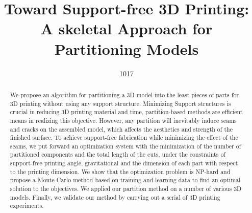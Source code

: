 \documentclass{egpubl}
\title[Toward Support-free 3D Printing:]%
      {Toward Support-free 3D Printing: A skeletal Approach for Partitioning Models}
\author[1017]{1017}
\begin{document}

\maketitle

\begin{abstract}
   We propose an algorithm for partitioning a 3D model into the least pieces of parts for 3D printing without using any support structure. Minimizing Support structures is crucial in reducing 3D printing material and time, partition-based methods are efficient means in realizing this objective. However, any partition will inevitably induce seams and cracks on the assembled model, which affects the aesthetics and strength of the finished surface. To achieve support-free fabrication while minimizing the effect of the seams, we put forward an optimization system with the minimization of the number of partitioned components and the total length of the cuts, under the constraints of support-free printing angle, gravitational and the dimension of each part with respect to the printing dimension. We show that the optimization problem is NP-hard and propose a Monte Carlo method based on training-and-learning data to find an optimal solution to the objectives. We applied our partition method on a number of various 3D models. Finally, we validate our method by carrying out a serial of 3D printing experiments.


\begin{classification} %
\end{classification}

\end{abstract}














\end{document}

